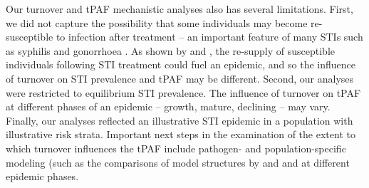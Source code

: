 Our turnover and tPAF mechanistic analyses also has several limitations.
First, we did not capture the possibility that some individuals may become
re-susceptible to infection after treatment
-- an important feature of many STIs such as syphilis and gonorrhoea
\citep{Fenton2008}.
As shown by \citet{Fenton2008} and \citet{Pourbohloul2003},
the re-supply of susceptible individuals following STI treatment
could fuel an epidemic, and so the influence of turnover on
STI prevalence and tPAF may be different.
Second, our analyses were restricted to equilibrium STI prevalence.
The influence of turnover on tPAF at different phases of an epidemic
-- growth, mature, declining --									%
may vary. Finally, our analyses reflected an illustrative STI epidemic
in a population with illustrative risk strata.
Important next steps in the examination of the extent to which turnover influences the tPAF include
pathogen- and population-specific modeling (such as the comparisons of model structures 
by \citet{Johnson2016} and %
and at different epidemic phases.


